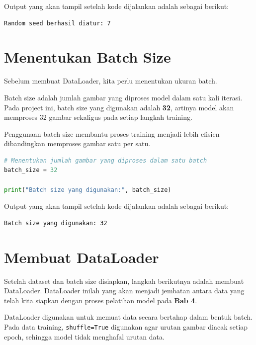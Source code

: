 Output yang akan tampil setelah kode dijalankan adalah sebagai berikut:

\begin{outputcode}[H]
\begin{lstlisting}[language={}]
Random seed berhasil diatur: 7
\end{lstlisting}
\caption{Output pengaturan random seed}
\end{outputcode}

\section{Menentukan Batch Size}

Sebelum membuat DataLoader, kita perlu menentukan ukuran batch.

Batch size adalah jumlah gambar yang diproses model dalam satu kali iterasi. Pada project ini, batch size yang digunakan adalah \textbf{32}, artinya model akan memproses 32 gambar sekaligus pada setiap langkah training.

Penggunaan batch size membantu proses training menjadi lebih efisien dibandingkan memproses gambar satu per satu.

\begin{lstlisting}[language=Python, caption=Menentukan batch size]
# Menentukan jumlah gambar yang diproses dalam satu batch
batch_size = 32

print("Batch size yang digunakan:", batch_size)
\end{lstlisting}

Output yang akan tampil setelah kode dijalankan adalah sebagai berikut:

\begin{outputcode}[H]
\begin{lstlisting}[language={}]
Batch size yang digunakan: 32
\end{lstlisting}
\caption{Output penentuan batch size}
\end{outputcode}

\section{Membuat DataLoader}

Setelah dataset dan batch size disiapkan, langkah berikutnya adalah membuat DataLoader. DataLoader inilah yang akan menjadi jembatan antara data yang telah kita siapkan dengan proses pelatihan model pada \textbf{Bab 4}.

DataLoader digunakan untuk memuat data secara bertahap dalam bentuk batch. Pada data training, \texttt{shuffle=True} digunakan agar urutan gambar diacak setiap epoch, sehingga model tidak menghafal urutan data.

